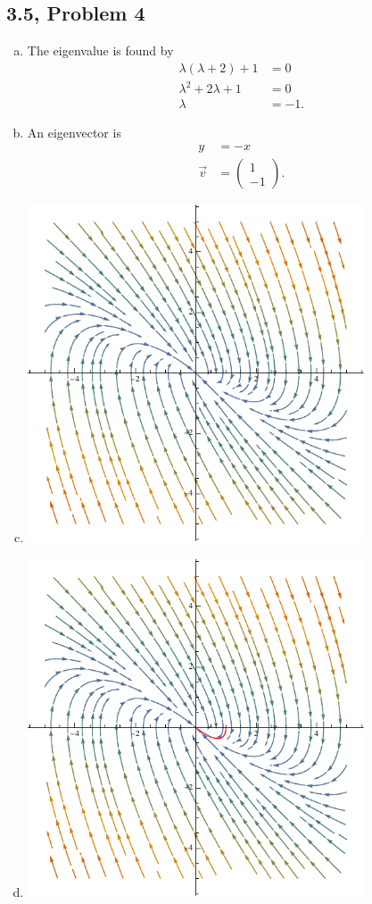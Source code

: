 \documentclass[10pt]{mypackage}
\begin{document}
\subsection{3.5, Problem 4}%
\begin{enumerate}[(a)]
  \item The eigenvalue is found by
    \begin{align*}
      \lambda\left(\lambda + 2\right) + 1 &= 0\\
      \lambda^2 + 2\lambda + 1 &= 0\\
      \lambda &= -1.
    \end{align*}
  \item An eigenvector is
    \begin{align*}
      y &= -x\\
      \vec{v} &= \begin{pmatrix}1\\-1\end{pmatrix}.
    \end{align*}
  \item \hfill
    \begin{center}
      \includegraphics[width=10cm]{images/3_5_4c.pdf}
    \end{center}
  \item \hfill
    \begin{center}
      \includegraphics[width=10cm]{images/3_5_4d.pdf}

\end{center}
\end{enumerate}
\end{document}
